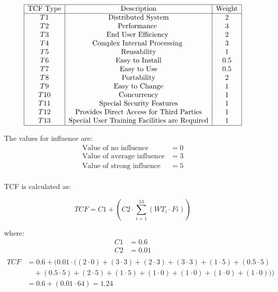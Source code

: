 \documentclass[runningheads]{llncs}
\begin{document}
\[
\begin{array}{|c|c|c|}
\hline
\text{TCF Type} & \text{Description} & \text{Weight} \\
\hline
T1 & \text{Distributed System} & 2 \\
T2 & \text{Performance   } & 3 \\
T3 & \text{End User Efficiency   } & 2 \\
T4 & \text{Complex Internal Processing   } & 3 \\
T5 & \text{Reusability} & 1 \\
T6 & \text{Easy to Install} & 0.5 \\
T7 & \text{Easy to Use} & 0.5 \\
T8 & \text{Portability} & 2 \\
T9 & \text{Easy to Change} & 1 \\
T10 & \text{Concurrency} & 1 \\
T11 & \text{Special Security Features} & 1 \\
T12 & \text{Provides Direct Access for Third Parties} & 1 \\
T13 & \text{Special User Training Facilities are Required} & 1 \\
\hline
\end{array}
\]

The values for influence are:
\begin{align*}
    \text{Value of no influence} &= 0 \\
    \text{Value of average influence} &= 3 \\
    \text{Value of strong influence} &= 5 \\
\end{align*}

TCF is calculated as:

\[
TCF = C1 + (C2 \cdot \sum_{i=1}^{13} (WT_i \cdot Fi))
\]

where:
\begin{align*}
    C1 &= 0.6 \\
    C2 &= 0.01 \\
\end{align*}
\begin{equation}
\begin{aligned}
    TCF &= 0.6 + (0.01 \cdot ((2 \cdot 0) + (3 \cdot 3) + (2 \cdot 3) + (3 \cdot 3) + (1 \cdot 5) + (0.5 \cdot 5) \\
    &\quad+ (0.5 \cdot 5) + (2 \cdot 5) + (1 \cdot 5) + (1 \cdot 0) + (1 \cdot 0) + (1 \cdot 0) + (1 \cdot 0))) \\
    &= 0.6 + (0.01 \cdot 64) = 1.24
\end{aligned}
\end{equation}
\end{document}
